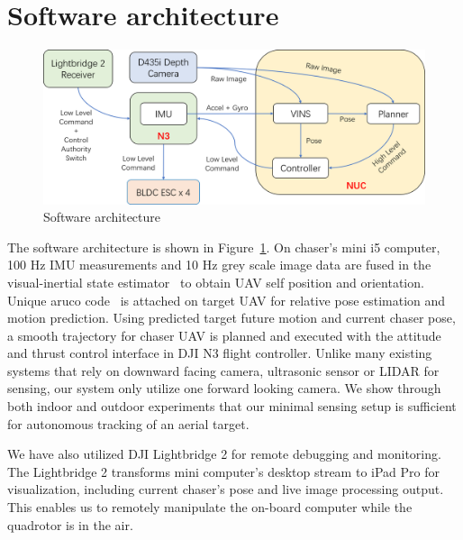 \section{Software architecture}\label{software}

\begin{figure}[ht]
  \centering
  \includegraphics[width=1.0\textwidth]{figure/chapter_4/system_diagram.png}
  \caption{Software architecture}
  \label{fig:software_architecture}
\end{figure}

The software architecture is shown in Figure~\ref{fig:software_architecture}. On chaser's mini i5 computer, 100 Hz IMU measurements and 10 Hz grey scale image data are fused in the visual-inertial state estimator~\cite{VINS} to obtain UAV self position and orientation. Unique aruco code~\cite{Aruco} is attached on target UAV for relative pose estimation and motion prediction. Using predicted target future motion and current chaser pose, a smooth trajectory for chaser UAV is planned and executed with the attitude and thrust control interface in DJI N3 flight controller. Unlike many existing systems that rely on downward facing camera, ultrasonic sensor or LIDAR for sensing, our system only utilize one forward looking camera. We show through both indoor and outdoor experiments that our minimal sensing setup is sufficient for autonomous tracking of an aerial target.

We have also utilized DJI Lightbridge 2 for remote debugging and monitoring. The Lightbridge 2 transforms mini computer's desktop stream to iPad Pro for visualization, including current chaser's pose and live image processing output. This enables us to remotely manipulate the on-board computer while the quadrotor is in the air.

\newpage
